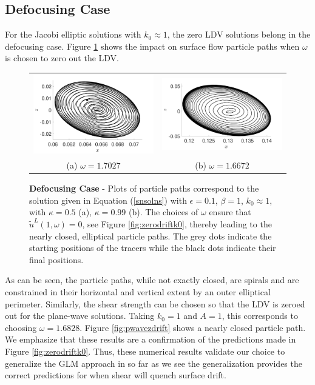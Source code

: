 \documentclass{JFM_Style/jfm}
\begin{document}
\subsection{Defocusing Case}

For the Jacobi elliptic solutions with $k_{0}\approx 1$, the zero LDV solutions belong in the defocusing case.  Figure \ref{fig:jaczerodrift} shows the impact on surface flow particle paths when $\omega$ is chosen to zero out the LDV.
\begin{figure}
\centering
\begin{tabular}{cc}
\includegraphics[width=.48\textwidth]{track_ep_pt1_tf_1_w_1pt703_kap_pt5_foc} & \includegraphics[width=.48\textwidth]{track_ep_pt1_tf_1_w_1pt667_kap_pt99_foc} \\
(a) $\omega=1.7027$ & (b) $\omega=1.6672$
\end{tabular}
\caption{\small {\bf Defocusing Case} - Plots of particle paths correspond to the solution given in Equation (\ref{snsolns}) with $\epsilon=0.1$, $\beta=1$, $k_{0}\approx 1$, with $\kappa=0.5$  (a), $\kappa=0.99$ (b). The choices of $\omega$ ensure that $\tilde{u}^{L}(1,\omega)=0$, see Figure \ref{fig:zerodriftk0}, thereby leading to the nearly closed, elliptical particle paths.  The grey dots indicate the starting positions of the tracers while the black dots indicate their final positions.  }
\label{fig:jaczerodrift}
\end{figure}
As can be seen, the particle paths, while not exactly closed, are spirals and are constrained in their horizontal and vertical extent by an outer elliptical perimeter.  Similarly, the shear strength can be chosen so that the LDV is zeroed out for the plane-wave solutions.  Taking $k_{0}=1$ and $A=1$, this corresponds to choosing $\omega = 1.6828$.  Figure \ref{fig:pwavezdrift} shows a nearly closed particle path.  We emphasize that these results are a confirmation of the predictions made in Figure \ref{fig:zerodriftk0}.  Thus, these numerical results validate our choice to generalize the GLM approach in so far as we see the generalization provides the correct predictions for when shear will quench surface drift.
\end{document}
